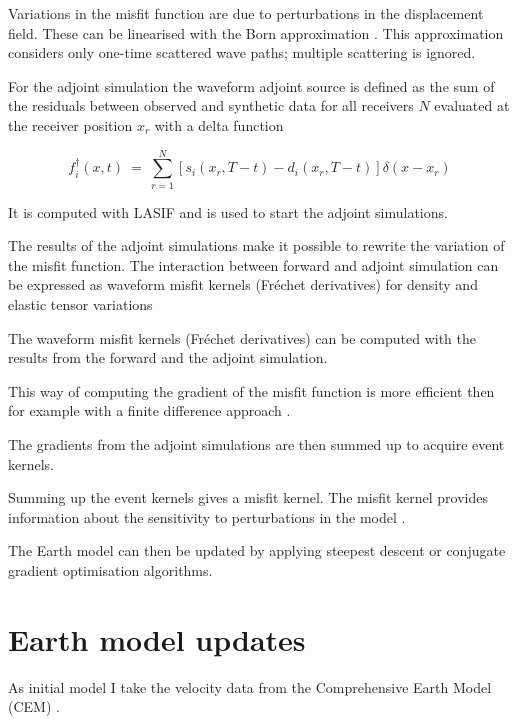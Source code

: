 Variations in the misfit function are due to perturbations in the displacement field. 
These can be linearised with the Born approximation \citep{Liu2012}.
This approximation %
considers only one-time scattered wave paths; multiple scattering is ignored.



For the adjoint simulation the waveform adjoint source is defined as the sum of the residuals between observed and 
synthetic data for all receivers $N$ evaluated at the receiver position $x_r$ with a delta function 

\begin{equation}
f_i^{\dagger}(x,t) \ = \ \sum_{r=1}^N [ s_i(x_r, T-t) - d_i(x_r, T-t) ] \delta (x-x_r)
\end{equation}

It is computed with LASIF and is used to start the adjoint simulations.



The results of the adjoint simulations make it possible to rewrite the variation of the misfit function.
The interaction between forward and adjoint simulation can be expressed as waveform misfit kernels (Fr\'{e}chet derivatives)
for density and elastic tensor variations 


The waveform misfit kernels (Fr\'{e}chet derivatives) can be computed with the results from the forward and the adjoint simulation. 

This way of computing the gradient of the misfit function is more efficient then for example with a finite difference 
approach \citep{Fichtner2006a}.


 
The gradients from the adjoint simulations are then summed up to acquire event kernels. %

Summing up the event kernels gives a misfit kernel. The misfit kernel provides information about the sensitivity to perturbations in the model \citep{Magnoni2012}.

The Earth model can then be updated by applying steepest descent or conjugate gradient optimisation algorithms. 



\chapter{Earth model updates}

As initial model I take the velocity data from the Comprehensive Earth Model (CEM) \citep{Afanasiev2014}.

